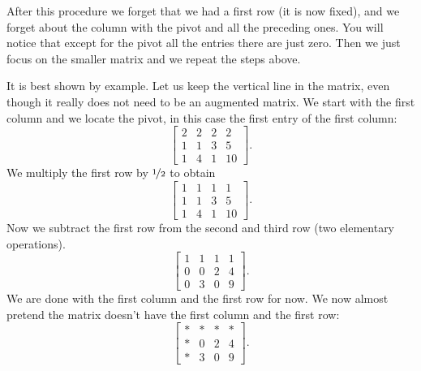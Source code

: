 After this procedure we forget that we had a first row (it is now fixed),
and we forget about the column with the pivot and all the preceding ones.
You will notice that except for the pivot all the entries there are just
zero.  Then we just focus on the smaller matrix and we repeat the steps
above.

It is best shown by example.  Let us keep the vertical line in the matrix,
even though it really does not need to be an augmented matrix.
We start with the first column and we locate the pivot, in this
case the first entry of the first column:
\begin{equation*}
\left[
\begin{array}{ccc|c}
\boxed{2} & 2 & 2 & 2 \\
1 & 1 & 3 & 5 \\
1 & 4 & 1 & 10
\end{array}
\right] .
\end{equation*}
We multiply the first row by
$\nicefrac{1}{2}$ to obtain
\begin{equation*}
\left[
\begin{array}{ccc|c}
\boxed{1} & 1 & 1 & 1 \\
1 & 1 & 3 & 5 \\
1 & 4 & 1 & 10
\end{array}
\right] .
\end{equation*}
Now we subtract the first row from the second and third row (two elementary
operations).
\begin{equation*}
\left[
\begin{array}{ccc|c}
1 & 1 & 1 & 1 \\
0 & 0 & 2 & 4 \\
0 & 3 & 0 & 9
\end{array}
\right] .
\end{equation*}
We are done with the first column and the first row for now.  We now almost
pretend the matrix doesn't have the first column and the first row:
\begin{equation*}
\left[
\begin{array}{ccc|c}
* & * & * & * \\
* & 0 & 2 & 4 \\
* & 3 & 0 & 9
\end{array}
\right] .
\end{equation*}

